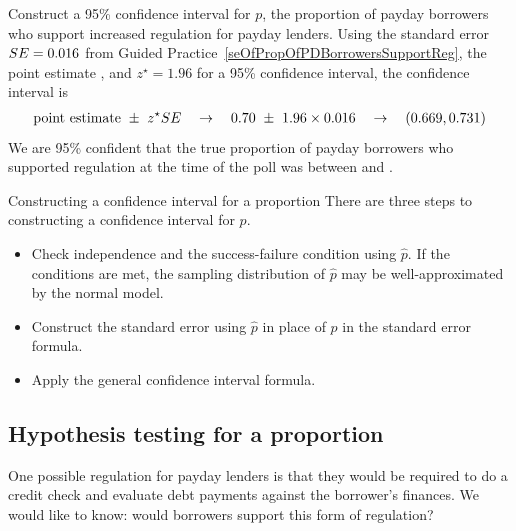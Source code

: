 \begin{examplewrap}
\begin{nexample}{Construct a 95\% confidence interval for $p$,
    the proportion of payday borrowers who support increased
    regulation for payday lenders.}
  Using the standard error $SE = 0.016{}$ from
  Guided Practice~\ref{seOfPropOfPDBorrowersSupportReg},
  the point estimate \paydayRegProp{},
  and $z^{\star} = 1.96$ for a 95\% confidence interval,
  the confidence interval is
  \begin{eqnarray*}
  \text{point estimate} \ \pm\ z^{\star}SE
      \quad\to\quad
      0.70{} \ \pm\ 1.96\times 0.016{}
      \quad\to\quad
      (0.669{}, 0.731{})
  \end{eqnarray*}
  We are 95\% confident that the true proportion of
  payday borrowers who supported regulation at the time
  of the poll was between \paydayRegLower{} and
  \paydayRegUpper{}.
\end{nexample}
\end{examplewrap}

\begin{onebox}{Constructing a confidence interval for a proportion}
  There are three steps to constructing a confidence
  interval for $p$.
  \begin{itemize}
  \setlength{\itemsep}{0mm}
  \item Check independence and the success-failure condition
      using $\hat{p}$.
      If the conditions are met, the sampling distribution
      of $\hat{p}$ may be well-approximated by the normal model.
  \item Construct the standard error using $\hat{p}$
      in place of $p$ in the standard error formula.
  \item Apply the general confidence interval formula.
  \end{itemize}
\end{onebox}


\subsection{Hypothesis testing for a proportion}
\label{htForPropSection}

\newcommand{\paydayCCPerc}{51\%}
\newcommand{\paydayCCProp}{0.51}
\newcommand{\paydayCCSE}{0.017}
\newcommand{\paydayCCSEPerc}{1.7\%}
\newcommand{\paydayCCZ}{0.59}
\newcommand{\paydayCCOneTail}{0.2776}
\newcommand{\paydayCCPvalue}{0.5552}

One possible regulation for payday lenders is that they
would be required to do a credit check and evaluate debt
payments against the borrower's finances.
We would like to know: would borrowers support this form
of regulation?


